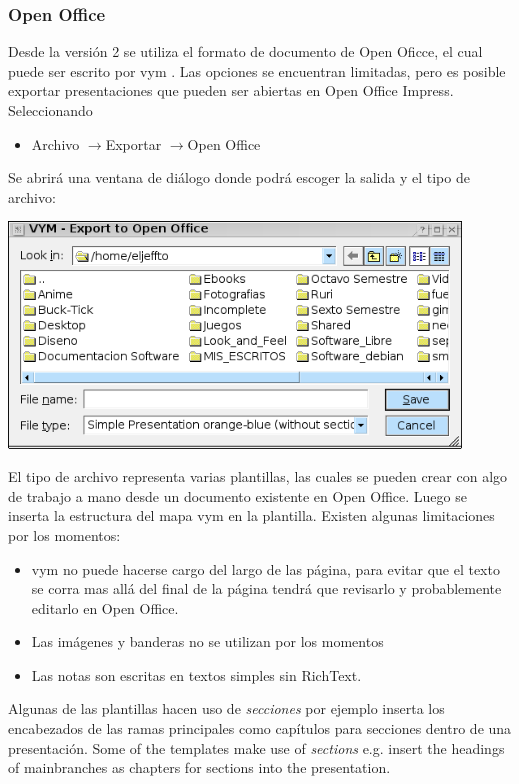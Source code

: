 \documentclass{article}
\newcommand{\vym}{{\sc vym }}
\newcommand{\ra}{$\longrightarrow$}
\begin{document}
\subsubsection*{Open Office}
Desde la versi\'on 2 se utiliza el formato de documento de Open Oficce, el cual puede ser escrito por \vym. Las opciones se encuentran limitadas, pero es posible exportar presentaciones que pueden ser abiertas en Open Office Impress. Seleccionando
\begin{itemize}
    \item Archivo \ra  Exportar \ra Open Office
\end{itemize}
Se abrir\'a una ventana de di\'alogo donde podr\'a escoger la salida y el tipo de archivo:
\begin{center}
    \includegraphics[width=12cm]{images/export-oo_es.png}
\end{center}

El tipo de archivo representa varias plantillas, las cuales se pueden crear con algo de trabajo a mano desde un documento existente en Open Office. Luego se inserta la estructura del mapa \vym en la plantilla. Existen algunas limitaciones por los momentos:
\begin{itemize}
    \item \vym no puede hacerse cargo del largo de las p\'agina, para evitar que el texto se corra mas all\'a del final de la p\'agina tendr\'a que revisarlo y probablemente editarlo en Open Office.
    \item Las im\'agenes y banderas no se utilizan por los momentos
    \item Las notas son escritas en textos simples sin RichText.
\end{itemize}
Algunas de las plantillas hacen uso de {\em secciones} por ejemplo inserta los encabezados de las ramas principales como cap\'itulos para secciones dentro de una presentaci\'on.
Some of the templates make use of {\em sections} e.g. insert the
headings of mainbranches as chapters for sections into the presentation.
\end{document}
